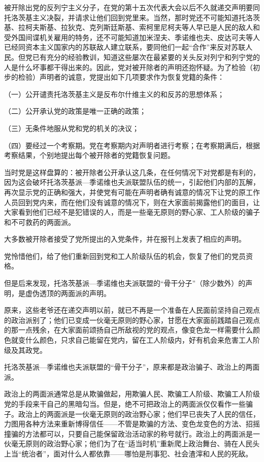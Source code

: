 被开除出党的反列宁主义分子，在党的第十五次代表大会以后不久就递交声明要同托洛茨基主义决裂，并请求让他们回到党里来。当然，那时党还不可能知道托洛茨基、拉柯夫斯基、拉狄克、克列斯廷斯基、索柯里尼柯夫等人早已是人民的敌人和受外国间谍机关雇用的特务，还不可能知道加米涅夫、季诺维也夫、皮达可夫等人已经同资本主义国家内的苏联敌人建立联系，要同他们一起“合作”来反对苏联人民。但党已有充分的经验教训，知道这些屡次在最紧要的关头反对列宁和列宁党的人是什么坏事都干得出来的。因此，党对被开除者的声明还抱怀疑。为了检验（初步的检验）声明者的诚意，党提出如下几项要求作为恢复党籍的条件：

（一）公开谴责托洛茨基主义是反布尔什维主义的和反苏的思想体系；

（二）公开承认党的政策是唯一正确的政策；

（三）无条件地服从党和党的机关的决议；

（四）要经过一个考察期。党在考察期内对声明者进行考察；在考察期满后，根据考察结果，个别地提出每个被开除者的党籍恢复问题。

当时党是这样盘算的：被开除者公开承认这几条，在任何情况下对党都是有利的，因为这会破坏托洛茨基派—季诺维也夫派联盟队伍的统一，引起他们内部的瓦解，再次显示党的正确和强大，并使党有可能在声明者确有诚意的情况下让党的原工作人员回到党内来，而在他们没有诚意的情况下，则在大家面前揭露他们的面目，让大家看到他们已经不是犯错误的人，而是一些毫无原则的野心家、工人阶级的骗子和不可救药的两面派。

大多数被开除者接受了党所提出的入党条件，并在报刊上发表了相应的声明。

党怜惜他们，给了他们重新回到党和工人阶级队伍的机会，恢复了他们的党员资格。

但是后来发现，托洛茨基派—季诺维也夫派联盟的“骨干分子”（除少数外）的声明，是虚伪透顶的两面派的声明。

原来，这些老爷还在递交声明以前，就已不再是一个准备在人民面前坚持自己观点的政治派别了；他们已变成一伙毫无原则的野心家，甘愿在大家面前践踏自己观点的那一点残余，在大家面前颂扬自己所敌视的党的观点，像变色龙一样需要什么颜色就变什么颜色，只求自己能留在党内，留在工人阶级内，好有机会来危害工人阶级及其政党。

托洛茨基派—季诺维也夫派联盟的“骨干分子”，原来都是政治骗子、政治上的两面派。

政治上的两面派通常总是从欺骗做起，用欺骗人民、欺骗工人阶级、欺骗工人阶级党的手段来干自己的黑暗勾当。但是，绝不可把政治上的两面派仅仅看作一些骗子。政治上的两面派是一伙毫无原则的政治野心家；他们早已丧失了人民的信任，力图用各种方法来重新博得信任——不管是欺骗的方法、变色龙变色的方法、招摇撞骗的方法都可以，只要自己能保留政治活动家的称号就行。政治上的两面派是一伙毫无原则的政治野心家；他们为了在“适当时机”重新爬上政治舞台、骑在人民头上当“统治者”，面对什么人都依靠——哪怕是刑事犯、社会渣滓和人民的死敌。


